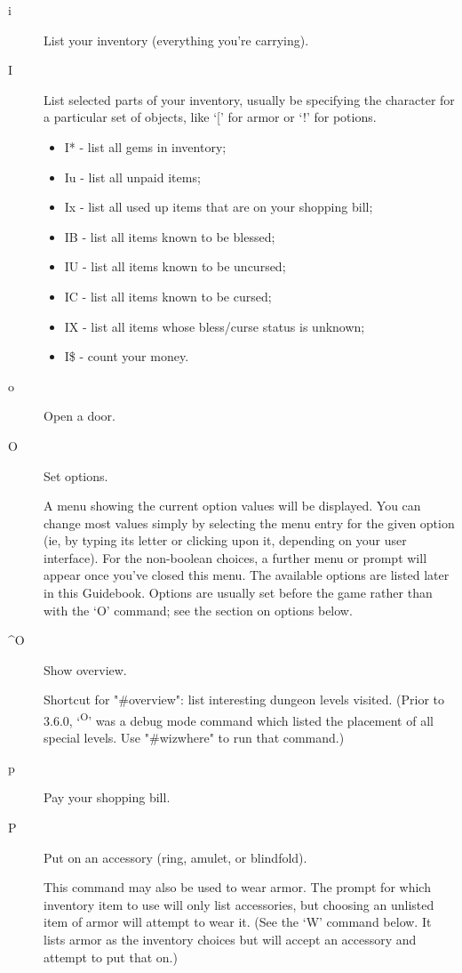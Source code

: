 \documentclass[11pt]{article}
\begin{document}
\begin{description}
\item[{i}] List your inventory (everything you're carrying).

\item[{I}] List selected parts of your inventory, usually be specifying
the character for a particular set of objects, like `[' for armor or
`!' for potions. 

\begin{itemize}
\item I* - list all gems in inventory;
\item Iu - list all unpaid items;
\item Ix - list all used up items that are on your shopping bill;
\item IB - list all items known to be blessed;
\item IU - list all items known to be uncursed;
\item IC - list all items known to be cursed;
\item IX - list all items whose bless/curse status is unknown;
\item I\$ - count your money.
\end{itemize}

\item[{o}] Open a door.

\item[{O}] Set options.

A menu showing the current option values will be displayed. You can
change most values simply by selecting the menu entry for the given
option (ie, by typing its letter or clicking upon it, depending on
your user interface). For the non-boolean choices, a further menu or
prompt will appear once you've closed this menu. The available
options are listed later in this Guidebook. Options are usually set
before the game rather than with the `O' command; see the section on
options below.

\item[{\^{}O}] Show overview.

Shortcut for "\#overview": list interesting dungeon levels
visited. (Prior to 3.6.0, `\textsuperscript{O}' was a debug mode command which listed
the placement of all special levels. Use "\#wizwhere" to run that
command.)

\item[{p}] Pay your shopping bill.

\item[{P}] Put on an accessory (ring, amulet, or blindfold).

This command may also be used to wear armor. The prompt for which
inventory item to use will only list accessories, but choosing an
unlisted item of armor will attempt to wear it. (See the `W' command
below. It lists armor as the inventory choices but will accept an
accessory and attempt to put that on.)


\end{description}
\end{document}
